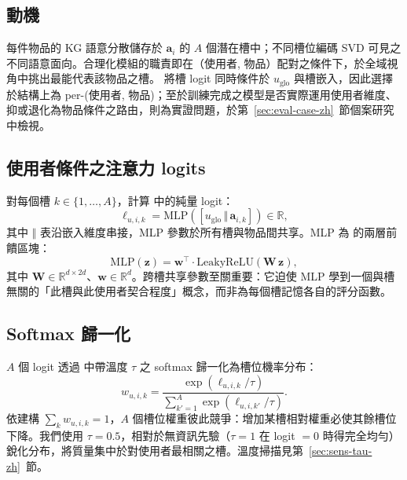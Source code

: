 \subsection{動機}
\label{sec:softmax-motivation-zh}

每件物品的 KG 語意分散儲存於 $\mathbf{a}_i$ 的 $A$ 個潛在槽中；不同槽位編碼 SVD 可見之不同語意面向。合理化模組的職責即在（使用者, 物品）配對之條件下，於全域視角中挑出最能代表該物品之槽。 將槽 logit 同時條件於 $u_{\mathrm{glo}}$ 與槽嵌入，因此選擇於結構上為 per-(使用者, 物品)；至於訓練完成之模型是否實際運用使用者維度、抑或退化為物品條件之路由，則為實證問題，於第~\ref{sec:eval-case-zh}~節個案研究中檢視。

\subsection{使用者條件之注意力 logits}
\label{sec:softmax-logit-zh}

對每個槽 $k \in \{1, \dots, A\}$，計算  中的純量 logit：
\begin{equation}
\label{eq:logit-zh}
\ell_{u, i, k} = \mathrm{MLP}\!\left( [u_{\mathrm{glo}} \,\Vert\, \mathbf{a}_{i,k}] \right) \in \mathbb{R},
\end{equation}
其中 $\Vert$ 表沿嵌入維度串接，MLP 參數於所有槽與物品間共享。MLP 為  的兩層前饋區塊：
\begin{equation}
\label{eq:mlp-zh}
\mathrm{MLP}(\mathbf{z}) = \mathbf{w}^{\top} \cdot \mathrm{LeakyReLU}\!\left(\mathbf{W}\, \mathbf{z}\right),
\end{equation}
其中 $\mathbf{W} \in \mathbb{R}^{d \times 2d}$、$\mathbf{w} \in \mathbb{R}^{d}$。跨槽共享參數至關重要：它迫使 MLP 學到一個與槽無關的「此槽與此使用者契合程度」概念，而非為每個槽記憶各自的評分函數。

\subsection{Softmax 歸一化}
\label{sec:softmax-softmax-zh}

$A$ 個 logit 透過  中帶溫度 $\tau$ 之 softmax 歸一化為槽位機率分布：
\begin{equation}
\label{eq:softmax-w-zh}
w_{u, i, k} = \frac{\exp(\ell_{u, i, k} / \tau)}{\sum_{k' = 1}^{A} \exp(\ell_{u, i, k'} / \tau)}.
\end{equation}
依建構 $\sum_k w_{u, i, k} = 1$，$A$ 個槽位權重彼此競爭：增加某槽相對權重必使其餘槽位下降。我們使用 $\tau = 0.5$，相對於無資訊先驗（$\tau = 1$ 在 logit $= 0$ 時得完全均勻）銳化分布，將質量集中於對使用者最相關之槽。溫度掃描見第~\ref{sec:sens-tau-zh}~節。

